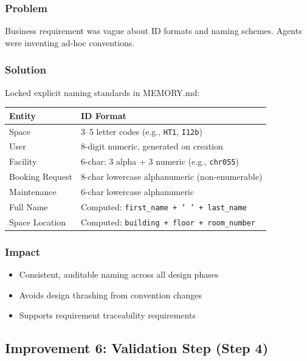 \documentclass[12pt,a4paper]{article}
\begin{document}
\subsubsection{Problem}
Business requirement was vague about ID formats and naming schemes. Agents were inventing ad-hoc conventions.

\subsubsection{Solution}
Locked explicit naming standards in MEMORY.md:

\begin{table}[h]
\centering
\begin{tabular}{|l|p{5cm}|}
\hline
\textbf{Entity} & \textbf{ID Format} \\
\hline
Space & 3--5 letter codes (e.g., \texttt{HT1}, \texttt{I12b}) \\
\hline
User & 8-digit numeric, generated on creation \\
\hline
Facility & 6-char: 3 alpha + 3 numeric (e.g., \texttt{chr055}) \\
\hline
Booking Request & 8-char lowercase alphanumeric (non-enumerable) \\
\hline
Maintenance & 6-char lowercase alphanumeric \\
\hline
Full Name & Computed: \texttt{first\_name + ' ' + last\_name} \\
\hline
Space Location & Computed: \texttt{building + floor + room\_number} \\
\hline
\end{tabular}
\end{table}

\subsubsection{Impact}
\begin{itemize}
    \item Consistent, auditable naming across all design phases
    \item Avoids design thrashing from convention changes
    \item Supports requirement traceability requirements
\end{itemize}

\subsection{Improvement 6: Validation Step (Step 4)}
\end{document}
